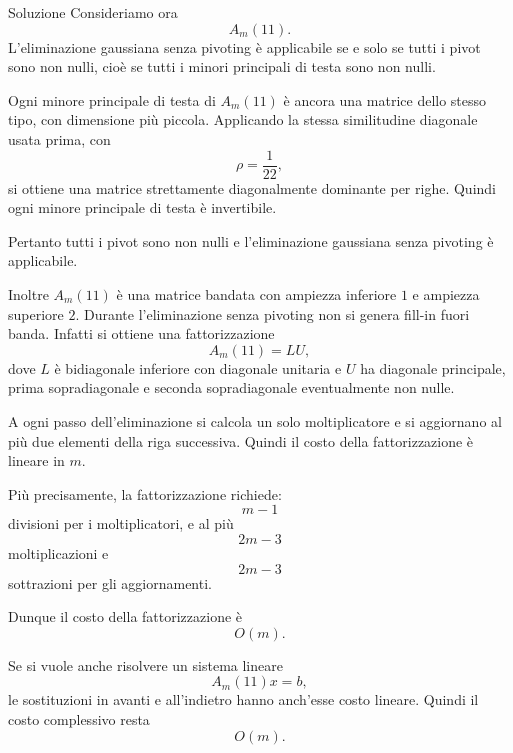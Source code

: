 \documentclass[a4paper]{article}
\begin{document}
\begin{snippetsolution}{Soluzione}
    Consideriamo ora
    \[
        A_m(11).
    \]
    L'eliminazione gaussiana senza pivoting è applicabile se e solo se tutti i pivot sono non nulli, cioè se tutti i minori principali di testa sono non nulli.

    Ogni minore principale di testa di \(A_m(11)\) è ancora una matrice dello stesso tipo, con dimensione più piccola. Applicando la stessa similitudine diagonale usata prima, con
    \[
        \rho=\frac{1}{22},
    \]
    si ottiene una matrice strettamente diagonalmente dominante per righe. Quindi ogni minore principale di testa è invertibile.

    Pertanto tutti i pivot sono non nulli e l'eliminazione gaussiana senza pivoting è applicabile.

    Inoltre \(A_m(11)\) è una matrice bandata con ampiezza inferiore \(1\) e ampiezza superiore \(2\). Durante l'eliminazione senza pivoting non si genera fill-in fuori banda. Infatti si ottiene una fattorizzazione
    \[
        A_m(11)=LU,
    \]
    dove \(L\) è bidiagonale inferiore con diagonale unitaria e \(U\) ha diagonale principale, prima sopradiagonale e seconda sopradiagonale eventualmente non nulle.

    A ogni passo dell'eliminazione si calcola un solo moltiplicatore e si aggiornano al più due elementi della riga successiva. Quindi il costo della fattorizzazione è lineare in \(m\).

    Più precisamente, la fattorizzazione richiede:
    \[
        m-1
    \]
    divisioni per i moltiplicatori, e al più
    \[
        2m-3
    \]
    moltiplicazioni e
    \[
        2m-3
    \]
    sottrazioni per gli aggiornamenti.

    Dunque il costo della fattorizzazione è
    \[
        \boxed{
            O(m).
        }
    \]

    Se si vuole anche risolvere un sistema lineare
    \[
        A_m(11)x=b,
    \]
    le sostituzioni in avanti e all'indietro hanno anch'esse costo lineare. Quindi il costo complessivo resta
    \[
        \boxed{
            O(m).
        }
    \]
\end{snippetsolution}
\end{document}
